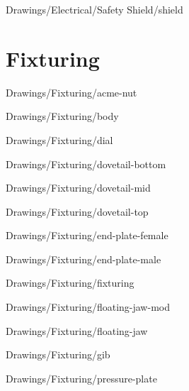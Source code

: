 
{Drawings/Electrical/Safety Shield/shield}

\section{Fixturing}


{Drawings/Fixturing/acme-nut}


{Drawings/Fixturing/body}


{Drawings/Fixturing/dial}


{Drawings/Fixturing/dovetail-bottom}


{Drawings/Fixturing/dovetail-mid}


{Drawings/Fixturing/dovetail-top}


{Drawings/Fixturing/end-plate-female}


{Drawings/Fixturing/end-plate-male}


{Drawings/Fixturing/fixturing}


{Drawings/Fixturing/floating-jaw-mod}


{Drawings/Fixturing/floating-jaw}


{Drawings/Fixturing/gib}


{Drawings/Fixturing/pressure-plate}

